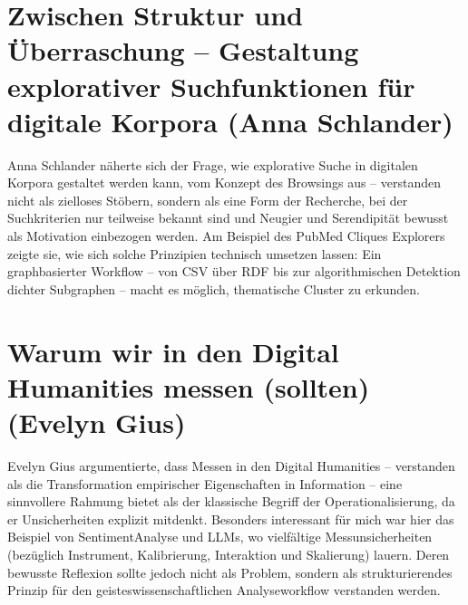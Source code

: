\documentclass[letterpaper,10pt,english]{jupyterBook}
\begin{document}
\section{Zwischen Struktur und Überraschung – Gestaltung explorativer Suchfunktionen für digitale Korpora (Anna Schlander)}
\label{\detokenize{tagung/anderes:zwischen-struktur-und-uberraschung-gestaltung-explorativer-suchfunktionen-fur-digitale-korpora-anna-schlander}}
\sphinxAtStartPar
Anna Schlander näherte sich der Frage, wie explorative Suche in digitalen Korpora gestaltet werden kann, vom Konzept des Browsings aus – verstanden nicht als zielloses Stöbern, sondern als eine Form der Recherche, bei der Suchkriterien nur teilweise bekannt sind und Neugier und Serendipität bewusst als Motivation einbezogen werden. Am Beispiel des PubMed Cliques Explorers zeigte sie, wie sich solche Prinzipien technisch umsetzen lassen: Ein graphbasierter Workflow – von CSV über RDF bis zur algorithmischen Detektion dichter Subgraphen – macht es möglich, thematische Cluster zu erkunden.


\section{Warum wir in den Digital Humanities messen (sollten) (Evelyn Gius)}
\label{\detokenize{tagung/anderes:warum-wir-in-den-digital-humanities-messen-sollten-evelyn-gius}}
\sphinxAtStartPar
Evelyn Gius argumentierte, dass Messen in den Digital Humanities – verstanden als die Transformation empirischer Eigenschaften in Information – eine sinnvollere Rahmung bietet als der klassische Begriff der Operationalisierung, da er Unsicherheiten explizit mitdenkt. Besonders interessant für mich war hier das Beispiel von Sentiment\sphinxhyphen{}Analyse und LLMs, wo vielfältige Messunsicherheiten (bezüglich Instrument, Kalibrierung, Interaktion und Skalierung) lauern. Deren bewusste Reflexion sollte jedoch nicht als Problem, sondern als strukturierendes Prinzip für den geisteswissenschaftlichen Analyseworkflow verstanden werden.
\end{document}

